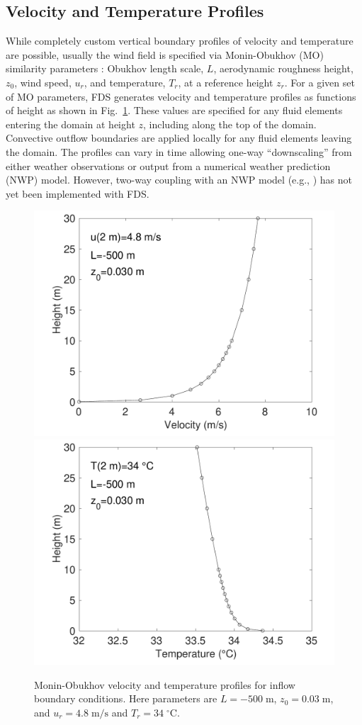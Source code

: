 \documentclass[journal,article,atmosphere,submit,moreauthors,pdftex]{Definitions/mdpi}
\begin{document}
\subsection{Velocity and Temperature Profiles}
\label{sec:veltmpprof}

While completely custom vertical boundary profiles of velocity and temperature are possible, usually the wind field is specified via Monin-Obukhov (MO) similarity parameters \cite{Dyer:1974}: Obukhov length scale, $L$, aerodynamic roughness height, $z_0$, wind speed, $u_r$, and temperature, $T_r$, at a reference height $z_r$.  For a given set of MO parameters, FDS generates velocity and temperature profiles as functions of height as shown in Fig.~\ref{fig:MOprofs}. These values are specified for any fluid elements entering the domain at height $z$, including along the top of the domain.  Convective outflow boundaries are applied locally for any fluid elements leaving the domain.  The profiles can vary in time allowing one-way ``downscaling'' from either weather observations or output from a numerical weather prediction (NWP) model.  However, two-way coupling with an NWP model (e.g., \cite{Coen:2013,CAWFE}) has not yet been implemented with FDS.

\begin{figure}[ht]
\centering
\includegraphics[width=.45\textwidth]{figures/vel_L=-500.pdf}
\includegraphics[width=.45\textwidth]{figures/tmp_L=-500.pdf}
\caption{Monin-Obukhov velocity and temperature profiles for inflow boundary conditions.  Here parameters are $L=-500\;\mathrm{m}$, $z_0=0.03\;\mathrm{m}$, and $u_r=4.8\;\mathrm{m/s}$ and $T_r=34\;^\circ\mathrm{C}$.} 
\label{fig:MOprofs}
\end{figure}
\end{document}
